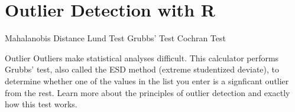 
\section{Outlier Detection with R}

\item Mahalanobis Distance
Lund Test
Grubbs' Test
Cochran Test

\newpage
Outlier 
Outliers make statistical analyses difficult. 
This calculator performs Grubbs' test, also called the ESD method (extreme studentized deviate), to determine whether one of the values in the list you enter is a signficant outlier from the rest. Learn more about the principles of outlier detection and exactly how this test works.


